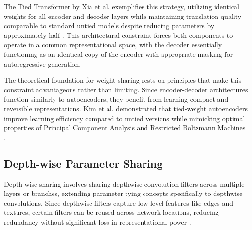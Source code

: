 \documentclass[12pt,a4paper]{article}
\begin{document}
The Tied Transformer by Xia et al. exemplifies this strategy, utilizing identical weights for all encoder and decoder layers while maintaining translation quality comparable to standard untied models despite reducing parameters by approximately half \cite{xia2019}. This architectural constraint forces both components to operate in a common representational space, with the decoder essentially functioning as an identical copy of the encoder with appropriate masking for autoregressive generation.

The theoretical foundation for weight sharing rests on principles that make this constraint advantageous rather than limiting. Since encoder-decoder architectures function similarly to autoencoders, they benefit from learning compact and reversible representations. Kim et al. demonstrated that tied-weight autoencoders improve learning efficiency compared to untied versions while mimicking optimal properties of Principal Component Analysis and Restricted Boltzmann Machines \cite{kim2024}.

\subsection{Depth-wise Parameter Sharing}

Depth-wise sharing involves sharing depthwise convolution filters across multiple layers or branches, extending parameter tying concepts specifically to depthwise convolutions. Since depthwise filters capture low-level features like edges and textures, certain filters can be reused across network locations, reducing redundancy without significant loss in representational power \cite{jeong2021}.
\end{document}
